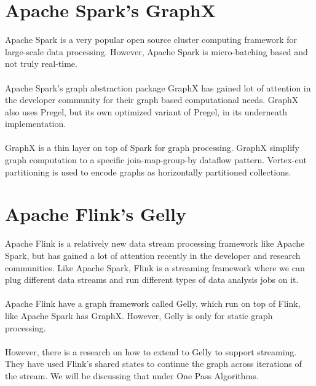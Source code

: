 \section{Apache Spark’s GraphX}
Apache Spark is a very popular open source cluster computing framework for large-scale data processing. However, Apache Spark is micro-batching based and not truly real-time. 

\paragraph{}

Apache Spark’s graph abstraction package GraphX has gained lot of attention in the developer community for their graph based computational needs. GraphX also uses Pregel, but its own optimized variant of Pregel, in its underneath implementation.

\paragraph{}

GraphX is a thin layer on top of Spark for graph processing. GraphX simplify graph computation to a specific join-map-group-by dataflow pattern. Vertex-cut partitioning is used to encode graphs as horizontally partitioned collections. 

\section{Apache Flink’s Gelly}
Apache Flink is a relatively new data stream processing framework like Apache Spark, but has gained a lot of attention recently in the developer and research communities. Like Apache Spark, Flink is a streaming framework where we can plug different data streams and run different types of data analysis jobs on it. 

\paragraph{}

Apache Flink have a graph framework called Gelly, which run on top of Flink, like Apache Spark has GraphX. However, Gelly is only for static graph processing. 

\paragraph{}

However, there is a research on how to extend to Gelly to support streaming. They have used Flink’s shared states to continue the graph across iterations of the stream. We will be discussing that under One Pass Algorithms. 

